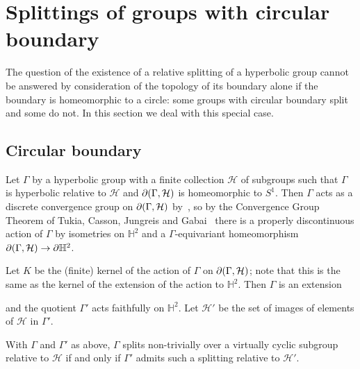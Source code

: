 \section{Splittings of groups with circular boundary}\label{sec:fuchsiangroups}

The question of the existence of a relative splitting of a hyperbolic group
cannot be answered by consideration of the topology of its boundary alone if
the boundary is homeomorphic to a circle: some groups with circular boundary
split and some do not. In this section we deal with this special case. 

\subsection{Circular boundary}

Let $\Gamma$ by a hyperbolic group with a finite collection $\mathcal{H}$ of
subgroups such that $\Gamma$ is hyperbolic relative to $\mathcal{H}$ and
$\partial(\Gamma, \mathcal{H})$ is homeomorphic to $S^1$. Then $\Gamma$ acts
as a discrete convergence group on $\partial(\Gamma, \mathcal{H})$
by~\cite{bowditch99c}, so by the Convergence Group Theorem of Tukia, Casson,
Jungreis and Gabai~\cite{tukia88,cassonjungreis94,gabai92} there is a properly
discontinuous action of $\Gamma$ by isometries on $\mathbb{H}^2$ and a
$\Gamma$-equivariant homeomorphism $\partial(\Gamma, \mathcal{H}) \to
\partial\mathbb{H}^2$.

Let $K$ be the (finite) kernel of the action of $\Gamma$ on $\partial(\Gamma,
\mathcal{H})$; note that this is the same as the kernel of the extension of the
action to $\mathbb{H}^2$. Then $\Gamma$ is an extension

  \begin{center}\end{center}
%
and the quotient $\Gamma'$ acts faithfully on $\mathbb{H}^2$. Let
$\mathcal{H}'$ be the set of images of elements of $\mathcal{H}$ in $\Gamma'$.

\begin{lem}\label{lem:quotientbyeffectivekernel} With $\Gamma$ and $\Gamma'$ as
above, $\Gamma$ splits non-trivially over a virtually cyclic subgroup relative to
$\mathcal{H}$ if and only if $\Gamma'$ admits such a splitting relative to
$\mathcal{H}'$.\end{lem}

